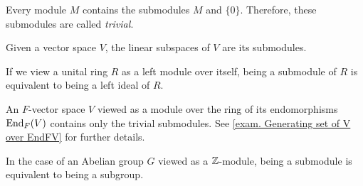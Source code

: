 \begin{exam}\begin{exlist}
\item Every module $M$ contains the submodules $M$ and $\lbrace 0\rbrace$. Therefore, these submodules are called \emph{trivial}.
\item Given a vector space $V$, the linear subspaces of $V$ are its submodules.
\item If we view a unital ring $R$ as a left module over itself, being a submodule of $R$ is equivalent to being a left ideal of $R$.
\item An $F$-vector space $V$ viewed as a module over the ring of its endomorphisms $\operatorname{\mathrm{End}}_F(V)$ contains only the trivial submodules. See \cref{exam. Generating set of V over EndFV} for further details.
\item In the case of an Abelian group $G$ viewed as a $\operatorname{\mathbb{Z}}$-module, being a submodule is equivalent to being a subgroup.
\end{exlist}\end{exam}

